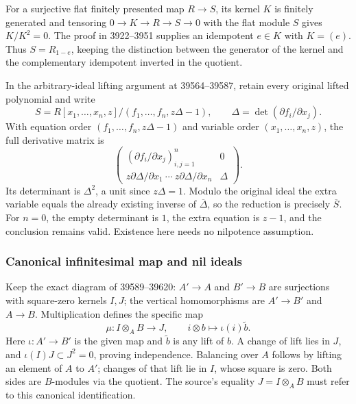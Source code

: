 For a surjective flat finitely presented map \(R\to S\), its kernel \(K\) is finitely generated and tensoring \(0\to K\to R\to S\to0\) with the flat module \(S\) gives \(K/K^2=0\). The proof in 3922--3951 supplies an idempotent \(e\in K\) with \(K=(e)\). Thus \(S=R_{1-e}\), keeping the distinction between the generator of the kernel and the complementary idempotent inverted in the quotient.

In the arbitrary-ideal lifting argument at 39564--39587, retain every original lifted polynomial and write \[
S=R[x_1,\ldots,x_n,z]/(f_1,\ldots,f_n,z\Delta-1),
\qquad \Delta=\det(\partial f_i/\partial x_j).
\] With equation order \((f_1,\ldots,f_n,z\Delta-1)\) and variable order \((x_1,\ldots,x_n,z)\), the full derivative matrix is \[
\begin{pmatrix}
(\partial f_i/\partial x_j)_{i,j=1}^n&0\\
z\partial\Delta/\partial x_1\ \cdots\ z\partial\Delta/\partial x_n&\Delta
\end{pmatrix}.
\] Its determinant is \(\Delta^2\), a unit since \(z\Delta=1\). Modulo the original ideal the extra variable equals the already existing inverse of \(\overline\Delta\), so the reduction is precisely \(\overline S\). For \(n=0\), the empty determinant is \(1\), the extra equation is \(z-1\), and the conclusion remains valid. Existence here needs no nilpotence assumption.

\subsubsection{Canonical infinitesimal map and nil ideals}\label{algebra-proof-051-canonical-infinitesimal-map-and-nil-ideals}

Keep the exact diagram of 39589--39620: \(A'\to A\) and \(B'\to B\) are surjections with square-zero kernels \(I,J\); the vertical homomorphisms are \(A'\to B'\) and \(A\to B\). Multiplication defines the specific map \[
\mu:I\otimes_A B\longrightarrow J,\qquad
i\otimes b\longmapsto \iota(i)\widetilde b.
\] Here \(\iota:A'\to B'\) is the given map and \(\widetilde b\) is any lift of \(b\). A change of lift lies in \(J\), and \(\iota(I)J\subset J^2=0\), proving independence. Balancing over \(A\) follows by lifting an element of \(A\) to \(A'\); changes of that lift lie in \(I\), whose square is zero. Both sides are \(B\)-modules via the quotient. The source's equality \(J=I\otimes_A B\) must refer to this canonical identification.

